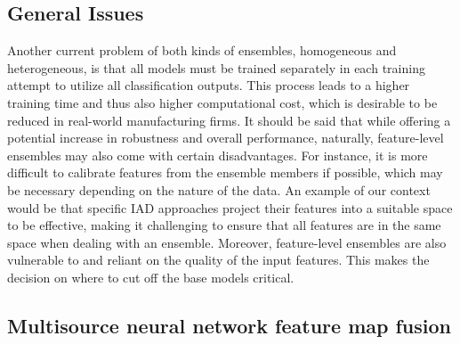 \subsection{General Issues}

Another current problem of both kinds of ensembles, homogeneous and heterogeneous, is that all models must be trained 
separately in each training attempt to utilize all classification outputs. This process leads to a higher training time and thus also higher computational 
cost, which is desirable to be reduced in real-world manufacturing firms.
It should be said that while offering a potential increase in robustness and overall performance, naturally, feature-level ensembles may also 
come with certain disadvantages. For instance, it is more difficult to calibrate features from the ensemble members if possible, which may 
be necessary depending on the nature of the data. An example of our context would be that specific IAD approaches project their features into a 
suitable space to be effective, making it challenging to ensure that all features are in the same space when dealing with an ensemble. 
Moreover, feature-level ensembles are also vulnerable to and reliant on the quality of the input features. This makes the decision on where 
to cut off the base models critical.

\subsection{Multisource neural network feature map fusion}

